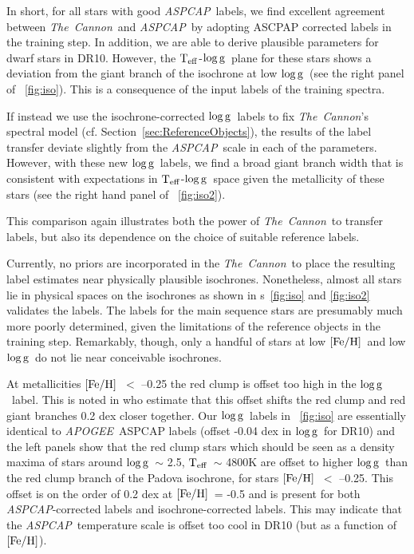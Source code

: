 \documentclass[12pt, preprint]{aastex}
\newcommand{\sectionname}{Section}
\newcommand{\figurenames}{\figurename s}
\newcommand{\tc}{\textsl{The~Cannon}}
\newcommand{\apogee}{\textsl{APOGEE}}
\newcommand{\aspcap}{\textsl{ASPCAP}}
\newcommand{\teff}{\mbox{$\rm T_{eff}$}}
\newcommand{\feh}{\mbox{$\rm [Fe/H]$}}
\newcommand{\logg}{\mbox{$\rm \log g$}}
\begin{document}
In short, for all stars with good \aspcap\ labels, we find excellent agreement between \tc\ and \aspcap\ by adopting ASCPAP corrected labels in the training step.
In addition, we are able to derive plausible parameters for dwarf stars in DR10. However, the \teff-\logg\ plane for these stars shows a deviation from the giant branch of the isochrone at low \logg\ (see the right panel of \figurename~\ref{fig:iso}). This is a consequence of the input labels of the training spectra. 

If instead we use the isochrone-corrected \logg\ labels to fix \tc 's spectral model
(cf. \sectionname~\ref{sec:ReferenceObjects}), the results of the label transfer deviate slightly from the \aspcap\ scale in each of the parameters. 
However, with these new \logg\ labels, we find a broad giant branch width that is consistent with expectations in \teff-\logg\ space 
given the metallicity of these stars (see the right hand panel of \figurename~\ref{fig:iso2}). 

This comparison again illustrates both the power of \tc\ to transfer labels, but also its dependence on the choice of suitable reference labels. 

Currently, no priors are incorporated in the \tc\ to place the resulting label estimates near physically plausible isochrones. 
Nonetheless, almost all stars lie in physical spaces on the isochrones as shown in \figurenames~\ref{fig:iso} and \ref{fig:iso2} validates the labels. 
The labels for the main sequence stars are presumably much more poorly determined, given the limitations of the reference objects in the training step. 
Remarkably, though, only a handful of stars at low \feh\ and low \logg\ do not lie near conceivable isochrones. 

At metallicities \feh\ $<$ --0.25 the red clump is offset too high in the \logg\ label. This is noted in \citet{bovy2014} who estimate that this offset shifts the red clump and red giant branches 0.2 dex closer together. 
Our \logg\ labels in \figurename~\ref{fig:iso} are essentially identical to \apogee\ ASPCAP labels (offset -0.04 dex in \logg\ for DR10) and the left panels show that the red clump stars which should be seen as a density maxima of stars around \logg\ $\sim$ 2.5, \teff\ $\sim$ 4800K \citep[e.g.,][]{Zhao2001} 
are offset to higher \logg\ than the red clump branch of the Padova isochrone, for stars \feh\ $<$ --0.25. 
This offset is on the order of 0.2 dex at \feh\ = -0.5 and is present for both \aspcap-corrected labels and isochrone-corrected labels. 
This may indicate that the \aspcap\ temperature scale is offset too cool in DR10 (but as a function of \feh).
\end{document}
